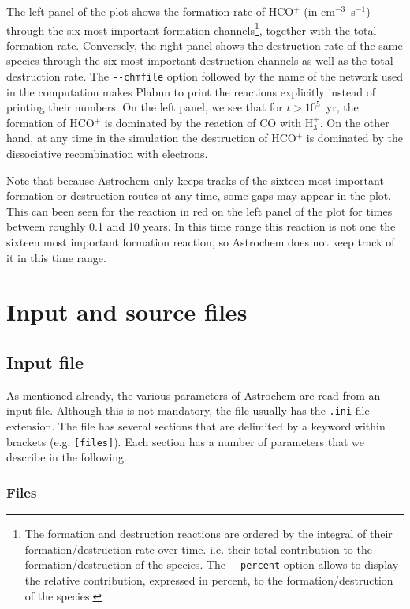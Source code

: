 \documentclass[a4paper,12pt]{article}
\begin{document}
The left panel of the plot shows the formation rate of HCO$^{+}$ (in
cm$^{-3}$~s$^{-1}$) through the six most important formation
channels\footnote{The formation and destruction reactions are ordered
  by the integral of their formation/destruction rate over
  time. i.e. their total contribution to the formation/destruction of
  the species. The \verb=--percent= option allows to display the
  relative contribution, expressed in percent, to the
  formation/destruction of the species.}, together with the total
formation rate. Conversely, the right panel shows the destruction rate
of the same species through the six most important destruction
channels as well as the total destruction rate. The \verb=--chmfile=
option followed by the name of the network used in the computation
makes Plabun to print the reactions explicitly instead of printing
their numbers. On the left panel, we see that for $t > 10^{5}$~yr, the
formation of HCO$^{+}$ is dominated by the reaction of CO with
H$_{3}^{+}$. On the other hand, at any time in the simulation the
destruction of HCO$^{+}$ is dominated by the dissociative
recombination with electrons.

Note that because Astrochem only keeps tracks of the sixteen most
important formation or destruction routes at any time, some gaps may
appear in the plot. This can been seen for the reaction in red on the
left panel of the plot for times between roughly 0.1 and 10 years. In
this time range this reaction is not one the sixteen most important
formation reaction, so Astrochem does not keep track of it in this
time range.

\section{Input and source files}
\label{sec:input-source-files}

\subsection{Input file}
\label{sec:input-file}

As mentioned already, the various parameters of Astrochem are read
from an input file. Although this is not mandatory, the file usually
has the \verb=.ini= file extension. The file has several sections that
are delimited by a keyword within brackets (e.g. \verb=[files]=). Each
section has a number of parameters that we describe in the following.

\subsubsection{Files}
\label{sec:files}
\end{document}

